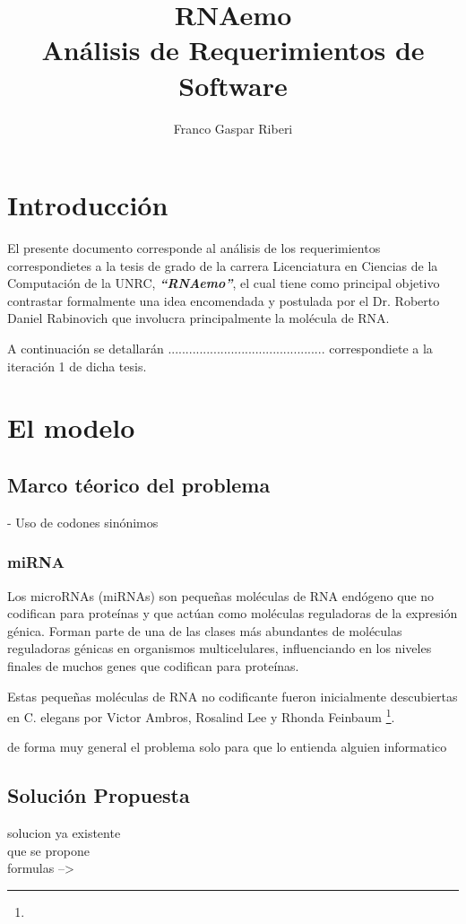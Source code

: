 \documentclass[12pt,a4paper,spanish]{article}
\title{\textbf{RNAemo}\\ \vspace{0.45cm} Análisis de Requerimientos de Software} %
\author{Franco Gaspar Riberi}
\begin{document}
\maketitle\pagebreak{}\tableofcontents{}\pagebreak{}

\newpage


\section{Introducción}
	\par El presente documento corresponde al análisis de los requerimientos correspondietes
	a la tesis de grado de la carrera Licenciatura en Ciencias de la Computación de la UNRC,
	\textit{\textbf{``RNAemo''}}, el cual tiene como principal objetivo contrastar formalmente
	una idea encomendada y postulada por el Dr. Roberto Daniel Rabinovich que involucra principalmente 
	la molécula de RNA. 
	\par A continuación se detallarán ............................................. correspondiete a la 
	iteración 1 de dicha tesis.

\section{El modelo}
	\subsection{Marco téorico del problema}
		- Uso de codones sinónimos
		
		\subsubsection{miRNA}
			\par Los microRNAs (miRNAs) son pequeñas moléculas de RNA endógeno que no 
			codifican para proteínas y que actúan como moléculas reguladoras de la expresión
			génica. Forman parte de una de las clases más abundantes de moléculas reguladoras génicas en organismos
			multicelulares, influenciando en los niveles finales de muchos genes que codifican para
			proteínas.
			\par Estas pequeñas moléculas de RNA no codificante fueron inicialmente descubiertas en
			C. elegans por Victor Ambros, Rosalind Lee y Rhonda Feinbaum \footnote{}.


			de forma muy general el problema solo para que lo entienda alguien informatico

	\subsection{Solución Propuesta}
		solucion ya existente \\
		que se propone \\
		formulas -->
		
\end{document}
